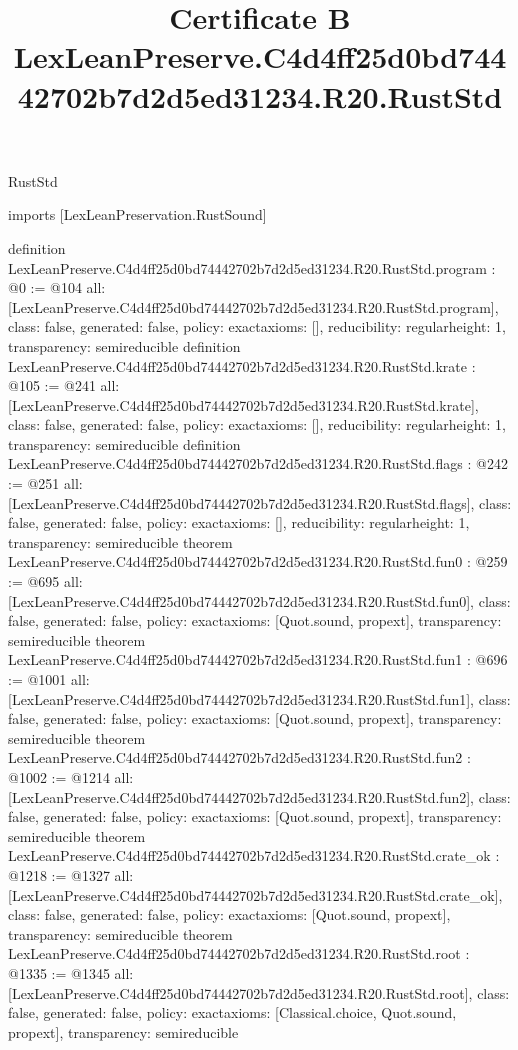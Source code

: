 \begin{lexlean}{RustStd}
\title{Certificate B LexLeanPreserve.C4d4ff25d0bd74442702b7d2d5ed31234.R20.RustStd}
\begin{coremodule}
imports [LexLeanPreservation.RustSound]

definition LexLeanPreserve.C4d4ff25d0bd74442702b7d2d5ed31234.R20.RustStd.program : @0 := @104 {
  all: [LexLeanPreserve.C4d4ff25d0bd74442702b7d2d5ed31234.R20.RustStd.program],
  class: false,
  generated: false,
  policy: exact{axioms: []},
  reducibility: regular{height: 1},
  transparency: semireducible
}
definition LexLeanPreserve.C4d4ff25d0bd74442702b7d2d5ed31234.R20.RustStd.krate : @105 := @241 {
  all: [LexLeanPreserve.C4d4ff25d0bd74442702b7d2d5ed31234.R20.RustStd.krate],
  class: false,
  generated: false,
  policy: exact{axioms: []},
  reducibility: regular{height: 1},
  transparency: semireducible
}
definition LexLeanPreserve.C4d4ff25d0bd74442702b7d2d5ed31234.R20.RustStd.flags : @242 := @251 {
  all: [LexLeanPreserve.C4d4ff25d0bd74442702b7d2d5ed31234.R20.RustStd.flags],
  class: false,
  generated: false,
  policy: exact{axioms: []},
  reducibility: regular{height: 1},
  transparency: semireducible
}
theorem LexLeanPreserve.C4d4ff25d0bd74442702b7d2d5ed31234.R20.RustStd.fun0 : @259 := @695 {
  all: [LexLeanPreserve.C4d4ff25d0bd74442702b7d2d5ed31234.R20.RustStd.fun0],
  class: false,
  generated: false,
  policy: exact{axioms: [Quot.sound, propext]},
  transparency: semireducible
}
theorem LexLeanPreserve.C4d4ff25d0bd74442702b7d2d5ed31234.R20.RustStd.fun1 : @696 := @1001 {
  all: [LexLeanPreserve.C4d4ff25d0bd74442702b7d2d5ed31234.R20.RustStd.fun1],
  class: false,
  generated: false,
  policy: exact{axioms: [Quot.sound, propext]},
  transparency: semireducible
}
theorem LexLeanPreserve.C4d4ff25d0bd74442702b7d2d5ed31234.R20.RustStd.fun2 : @1002 := @1214 {
  all: [LexLeanPreserve.C4d4ff25d0bd74442702b7d2d5ed31234.R20.RustStd.fun2],
  class: false,
  generated: false,
  policy: exact{axioms: [Quot.sound, propext]},
  transparency: semireducible
}
theorem LexLeanPreserve.C4d4ff25d0bd74442702b7d2d5ed31234.R20.RustStd.crate_ok : @1218 := @1327 {
  all: [LexLeanPreserve.C4d4ff25d0bd74442702b7d2d5ed31234.R20.RustStd.crate_ok],
  class: false,
  generated: false,
  policy: exact{axioms: [Quot.sound, propext]},
  transparency: semireducible
}
theorem LexLeanPreserve.C4d4ff25d0bd74442702b7d2d5ed31234.R20.RustStd.root : @1335 := @1345 {
  all: [LexLeanPreserve.C4d4ff25d0bd74442702b7d2d5ed31234.R20.RustStd.root],
  class: false,
  generated: false,
  policy: exact{axioms: [Classical.choice, Quot.sound, propext]},
  transparency: semireducible
}


\end{coremodule}
\end{lexlean}
